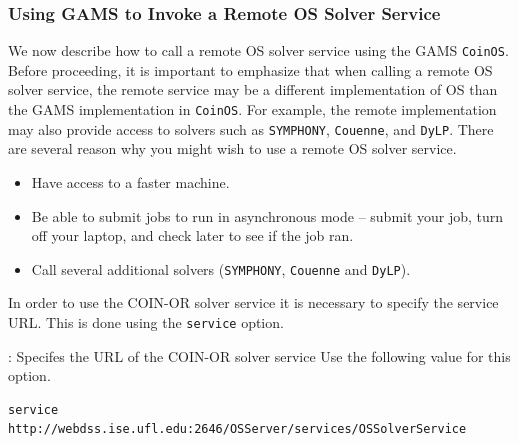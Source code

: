 \documentclass[11pt]{article}
\renewcommand{\_}{{\char"5F}}
\renewcommand{\{}{{\char"7B}}
\renewcommand{\}}{{\char"7D}}
\renewcommand{\^}{{\char"0D}}
\renewcommand{\'}{{\char"0D}}
\begin{document}
\begin{enumerate}[Step 1:]
\subsubsection{Using GAMS  to Invoke a Remote OS Solver Service}\label{section:gamsremote}

We now describe how to call  a remote OS   solver service using the GAMS {\tt CoinOS}.  Before proceeding, 
it is important to emphasize that when calling a remote OS solver service, the remote service may be a 
different implementation of OS than the GAMS implementation in {\tt CoinOS}. For example, the remote 
implementation may also provide access to solvers such as {\tt SYMPHONY}, {\tt Couenne}, and {\tt DyLP}.  
There are several reason why you might wish to use a remote OS solver service. 

\begin{itemize}
\item Have access to a faster machine.

\item  Be able to  submit jobs to run in asynchronous mode -- submit your job,  turn off your laptop,  
and check later to see if the job ran.

\item Call several additional solvers ({\tt SYMPHONY}, {\tt Couenne} and {\tt DyLP}).

\end{itemize}

In order to use  the COIN-OR solver service it is necessary to specify the service URL. 
This is done using the {\tt service} option.

\vskip 8pt
: Specifes the URL of  the COIN-OR solver service
\vskip 8pt
Use the following value for this option.
\begin{verbatim}
service http://webdss.ise.ufl.edu:2646/OSServer/services/OSSolverService
\end{verbatim}


\end{enumerate}
\end{document}
